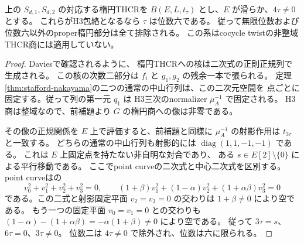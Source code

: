 \begin{corollary}[通常のStafford族は位数六へ還元される]
\label{cor:stafford-order-six-only}
上の $S_{d,1},S_{d,2}$ の対応する楕円THCRを
$B(E,L,t_\tau)$ とし、$E$ が滑らか、$4\tau\ne0$ とする。
これらがH3包絡となるなら $\tau$ は位数六である。
従って無限位数および位数六以外のproper楕円部分は全て排除される。
この系はcocycle twistの非整域THCR商には適用していない。
\end{corollary}
\begin{proof}
Davies\cite[Theorem 6.1.10の証明]{DaviesThesis}で確認されるように、
楕円THCRへの核は二次式の正則正規列で生成される。
この核の次数二部分は $f_i$ と $g_1,g_2$ の残余一本で張られる。
定理\ref{thm:stafford-nakayama}の二つの通常の中山行列は、この二次元空間を
点ごとに固定する。従って列の第一元 $q_1$ は
H3三次のnormalizer $\mu_A^{-1}$ で固定される。
H3商は整域なので、前補題より $G$ の楕円商への像は非零である。

その像の正規関係を $E$ 上で評価すると、前補題と同様に
$\mu_A^{-1}$ の射影作用は $t_{3\tau}$ と一致する。
どちらの通常の中山行列も射影的には
$\operatorname{diag}(1,1,-1,-1)$ である。
これは $E$ 上固定点を持たない非自明な対合であり、
ある $s\in E[2]\setminus\{0\}$ による平行移動である。
ここでpoint curveの二次式と中心二次式を区別する。
point curveは\cite[Definition--Lemma 2.4]{WWYSklyanin4}の
\[
 v_0^2+v_1^2+v_2^2+v_3^2=0,\qquad
 (1+\beta)v_1^2+(1-\alpha)v_2^2+(1+\alpha\beta)v_3^2=0
\]
である。この二式と射影固定平面 $v_2=v_3=0$ の交わりは
$1+\beta\ne0$ により空である。
もう一つの固定平面 $v_0=v_1=0$ との交わりも
$(1-\alpha)-(1+\alpha\beta)=-\alpha(1+\beta)\ne0$ により空である。
従って $3\tau=s$、$6\tau=0$、$3\tau\ne0$。
位数二は $4\tau\ne0$ で除外され、位数は六に限られる。
\end{proof}

